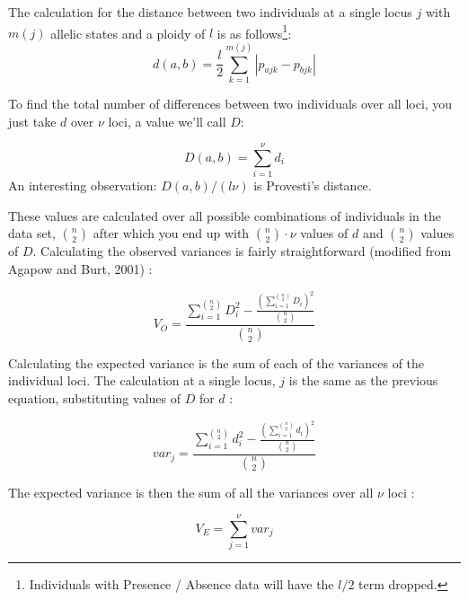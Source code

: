 \documentclass[letterpaper]{article}\usepackage[]{graphicx}\usepackage[]{color}
\begin{document}
The calculation for the distance between two individuals at a single locus $j$
with $m(j)$ allelic states and a ploidy of $l$ is as follows\footnote{Individuals
with Presence / Absence data will have the $l/2$ term dropped.}:
\begin{equation}
\label{eq:ia_d}
  d(a,b)=\frac{l}{2} \sum_{k=1}^{m(j)}
  |p_{ajk} - p_{bjk}|
\end{equation}


\noindent
To find the total number of differences between two individuals over all loci,
you just take $d$ over $\nu$ loci, a value we'll call $D$:

\begin{equation}
\label{eq:ia_D}
D(a,b) = \displaystyle \sum_{i=1}^{\nu} d_i
\end{equation}
An interesting observation: $D(a,b)/(l\nu)$ is Provesti's distance.

These values are calculated over all possible combinations of individuals in the
data set, ${n \choose 2}$ after which you end up with ${n \choose 2}\cdot{}\nu$
values of $d$ and ${n \choose 2}$ values of $D$. Calculating the observed
variances is fairly straightforward (modified from Agapow and Burt, 2001)
\citep{Agapow:2001}:

\begin{equation}
\label{eq:V_O}
V_O = \frac{\displaystyle \sum_{i=1}^{n \choose 2} D_{i}^2 - \frac{\left(\displaystyle\sum_{i=1}^{n \choose 2} D_{i}\right)^2}{{n \choose 2}}}{{n \choose 2}}
\end{equation}

Calculating the expected variance is the sum of each of the variances of the
individual loci. The calculation at a single locus, $j$ is the same as the
previous equation, substituting values of $D$ for $d$ \citep{Agapow:2001}:

\begin{equation}
\label{eq:var_j}
var_j = \frac{\displaystyle \sum_{i=1}^{n \choose 2} d_{i}^2 - \frac{\left(\displaystyle\sum_{i=1}^{n \choose 2} d_i\right)^2}{{n \choose 2}}}{{n \choose 2}}
\end{equation}

The expected variance is then the sum of all the variances over all $\nu$ loci
\citep{Agapow:2001}:

\begin{equation}
\label{eq:V_E}
V_E = \displaystyle \sum_{j=1}^{\nu} var_j
\end{equation}
\end{document}
